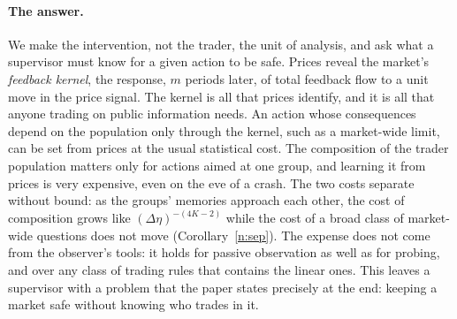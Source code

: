 \paragraph{The answer.} We make the intervention, not the trader, the unit of analysis, and ask what a supervisor must know for a given action to be safe. Prices reveal the market's \emph{feedback kernel}, the response, $m$ periods later, of total feedback flow to a unit move in the price signal. The kernel is all that prices identify, and it is all that anyone trading on public information needs. An action whose consequences depend on the population only through the kernel, such as a market-wide limit, can be set from prices at the usual statistical cost. The composition of the trader population matters only for actions aimed at one group, and learning it from prices is very expensive, even on the eve of a crash. The two costs separate without bound: as the groups' memories approach each other, the cost of composition grows like $(\Delta\eta)^{-(4K-2)}$ while the cost of a broad class of market-wide questions does not move (Corollary~\ref{n:sep}). The expense does not come from the observer's tools: it holds for passive observation as well as for probing, and over any class of trading rules that contains the linear ones. This leaves a supervisor with a problem that the paper states precisely at the end: keeping a market safe without knowing who trades in it.

